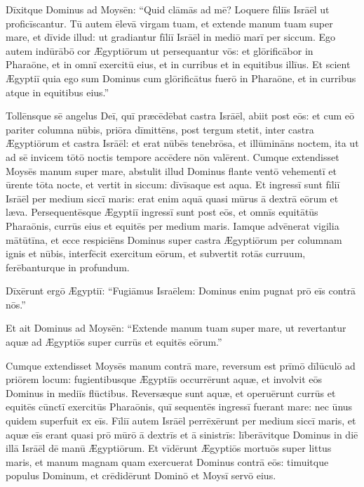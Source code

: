 Dīxitque Dominus ad Moysēn: ``Quid clāmās ad mē? Loquere
fīliīs Isrāēl ut proficīscantur. Tū autem ēlevā virgam tuam, et extende manum tuam super mare, et dīvide illud:
ut gradiantur fīliī Isrāēl in mediō marī per siccum. Ego autem
indūrābō cor Ægyptiōrum ut persequantur vōs: et glōrificābor in Pharaōne,
et in omnī exercitū eius, et in curribus et in equitibus illīus. Et
scient Ægyptiī quia ego sum Dominus cum glōrificātus fuerō
in Pharaōne, et in curribus atque in equitibus eius.''

Tollēnsque sē
angelus Deī, quī præcēdēbat castra Isrāēl, abiit post eōs:
et cum eō pariter columna nūbis, priōra dīmittēns,
post tergum stetit, inter castra Ægyptiōrum et castra Isrāēl: et erat
nūbēs tenebrōsa, et illūmināns noctem, ita
ut ad sē invicem tōtō noctis tempore accēdere nōn valērent.
Cumque extendisset Moysēs manum super mare, abstulit illud Dominus
flante ventō vehementī et ūrente
tōta nocte, et vertit in siccum: dīvīsaque est aqua. Et
ingressī sunt fīliī Isrāēl per medium siccī maris:
erat enim aquā quasi mūrus ā dextrā eōrum et læva. Persequentēsque
Ægyptiī ingressī sunt post eōs, et omnīs equitātūs Pharaōnis, currūs eius
et equitēs per medium maris. Iamque advēnerat vigilia
mātūtīna, et ecce respiciēns Dominus super castra Ægyptiōrum per columnam ignis et
nūbis, interfēcit exercitum eōrum, et subvertit
rotās curruum, ferēbanturque in profundum.

Dīxērunt ergō Ægyptiī: ``Fugiāmus Israēlem: Dominus enim
pugnat prō eīs contrā nōs.''

Et ait Dominus ad Moysēn: ``Extende manum tuam
super mare, ut revertantur aquæ ad Ægyptiōs super currūs et equitēs
eōrum.''

Cumque extendisset Moysēs manum contrā mare, reversum est prīmō
dīlūculō ad priōrem locum: fugientibusque
Ægyptiīs occurrērunt aquæ, et involvit eōs Dominus in
mediīs flūctibus. Reversæque sunt aquæ, et operuērunt currūs et equitēs
cūnctī exercitūs Pharaōnis, quī sequentēs ingressī fuerant mare: nec ūnus
quidem superfuit ex eīs. Fīliī autem Isrāēl perrēxērunt per medium siccī
maris, et aquæ eīs erant quasi prō mūrō ā dextrīs et ā sinistrīs: 
līberāvitque Dominus in diē illā Isrāēl dē manū Ægyptiōrum. 
Et vīdērunt
Ægyptiōs mortuōs super littus maris, et manum magnam quam
exercuerat Dominus contrā eōs: timuitque populus Dominum, et crēdidērunt
Dominō et Moysī servō eius.
